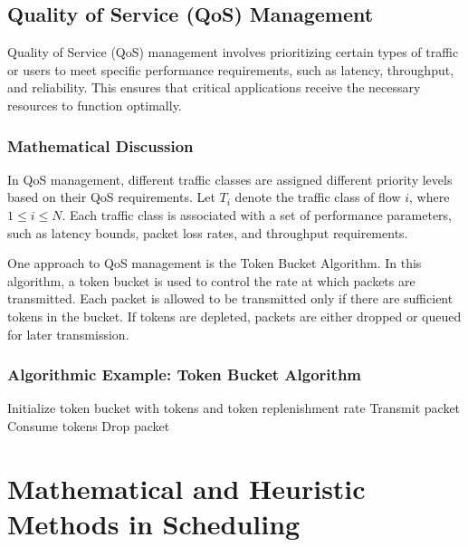 \documentclass[12pt]{book} %
\begin{document}
\subsection{Quality of Service (QoS) Management}

Quality of Service (QoS) management involves prioritizing certain types of traffic or users to meet specific performance requirements, such as latency, throughput, and reliability. This ensures that critical applications receive the necessary resources to function optimally.

\subsubsection{Mathematical Discussion}

In QoS management, different traffic classes are assigned different priority levels based on their QoS requirements. Let $T_i$ denote the traffic class of flow $i$, where $1 \leq i \leq N$. Each traffic class is associated with a set of performance parameters, such as latency bounds, packet loss rates, and throughput requirements.

One approach to QoS management is the Token Bucket Algorithm. In this algorithm, a token bucket is used to control the rate at which packets are transmitted. Each packet is allowed to be transmitted only if there are sufficient tokens in the bucket. If tokens are depleted, packets are either dropped or queued for later transmission.

\subsubsection{Algorithmic Example: Token Bucket Algorithm}
\FloatBarrier
\begin{algorithm}[H]
\caption{Token Bucket Algorithm}
\begin{algorithmic}[1]
\State Initialize token bucket with tokens and token replenishment rate
        \State Transmit packet
        \State Consume tokens
    \Else
        \State Drop packet
    \EndIf
\EndWhile
\end{algorithmic}
\end{algorithm}
\FloatBarrier

\section{Mathematical and Heuristic Methods in Scheduling}
\end{document}
